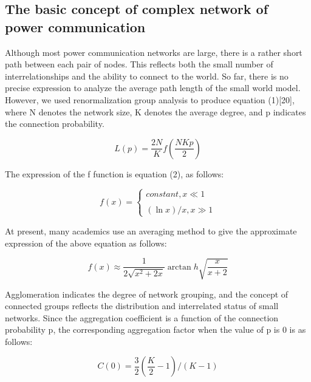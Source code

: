 \documentclass[AMA,STIX1COL]{WileyNJD-v2}
\begin{document}
\subsection{The basic concept of complex network of power communication}
\par Although most power communication networks are large, there is a rather short path between each pair of nodes. This reflects both the small number of interrelationships and the ability to connect to the world. So far, there is no precise expression to analyze the average path length of the small world model. However, we used renormalization group analysis to produce equation (1)[20], where N denotes the network size, K denotes the average degree, and p indicates the connection probability.

\begin{equation} 
L\left ( p \right )= \frac{2N}{K}f\left ( \frac{NKp}{2} \right )
\end{equation}

The expression of the f function is equation (2), as follows:

\begin{equation} 
f\left ( x \right )= \left\{\begin{matrix}
constant, x\ll 1\\ \\
\left ( \ln x \right )/{x},        x\gg  1
\end{matrix}\right.
\end{equation}

\par At present, many academics use an averaging method to give the approximate expression of the above equation as follows:

\begin{equation} 
f\left ( x \right )\approx \frac{1}{2\sqrt{x^{2}+2x}}\arctan h\sqrt{\frac{x}{x+2}}
\end{equation}

Agglomeration indicates the degree of network grouping, and the concept of connected groups reflects the distribution and interrelated status of small networks. Since the aggregation coefficient is a function of the connection probability p, the corresponding aggregation factor when the value of p is 0 is as follows:

\begin{equation} 
C\left ( 0 \right ) = \frac{3}{2}\left ( \frac{K}{2} - 1 \right )/\left (K-1  \right )
\end{equation}
\end{document}

